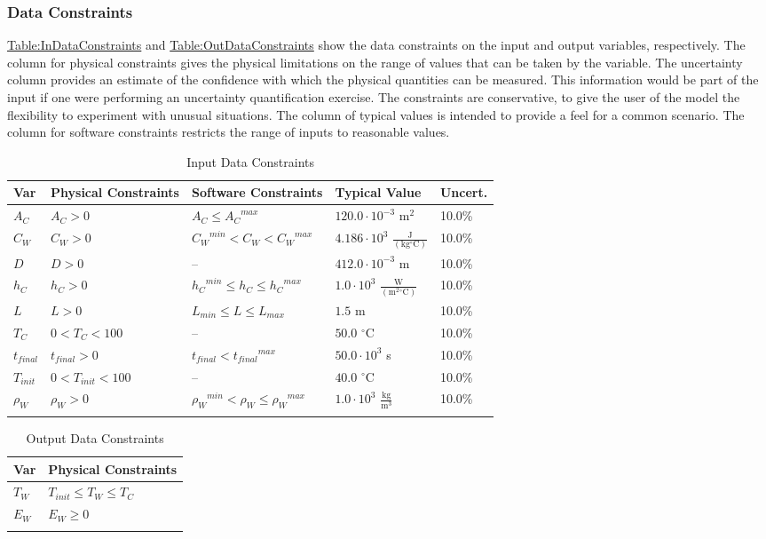 \documentclass[12pt]{article}
\begin{document}
\subsubsection{Data Constraints}
\label{Sec:DataConstraints}
\hyperref[Table:InDataConstraints]{Table:InDataConstraints} and \hyperref[Table:OutDataConstraints]{Table:OutDataConstraints} show the data constraints on the input and output variables, respectively. The column for physical constraints gives the physical limitations on the range of values that can be taken by the variable. The uncertainty column provides an estimate of the confidence with which the physical quantities can be measured. This information would be part of the input if one were performing an uncertainty quantification exercise. The constraints are conservative, to give the user of the model the flexibility to experiment with unusual situations. The column of typical values is intended to provide a feel for a common scenario. The column for software constraints restricts the range of inputs to reasonable values.
\begin{longtable}{l l l l l}
\toprule
Var & Physical Constraints & Software Constraints & Typical Value & Uncert.
\\
\midrule
${A_{C}}$ & ${A_{C}}>0$ & ${A_{C}}\leq{}{{A_{C}}^{max}}$ & $120.0\cdot{}10^{-3}$ $\text{m}^{2}$ & 10.0\%
\\
${C_{W}}$ & ${C_{W}}>0$ & ${{C_{W}}^{min}}<{C_{W}}<{{C_{W}}^{max}}$ & $4.186\cdot{}10^{3}$ $\frac{\text{J}}{(\text{kg}{}^{\circ}\text{C})}$ & 10.0\%
\\
$D$ & $D>0$ & -- & $412.0\cdot{}10^{-3}$ m & 10.0\%
\\
${h_{C}}$ & ${h_{C}}>0$ & ${{h_{C}}^{min}}\leq{}{h_{C}}\leq{}{{h_{C}}^{max}}$ & $1.0\cdot{}10^{3}$ $\frac{\text{W}}{(\text{m}^{2}{}^{\circ}\text{C})}$ & 10.0\%
\\
$L$ & $L>0$ & ${L_{min}}\leq{}L\leq{}{L_{max}}$ & $1.5$ m & 10.0\%
\\
${T_{C}}$ & $0<{T_{C}}<100$ & -- & $50.0$ ${}^{\circ}$C & 10.0\%
\\
${t_{final}}$ & ${t_{final}}>0$ & ${t_{final}}<{{t_{final}}^{max}}$ & $50.0\cdot{}10^{3}$ s & 10.0\%
\\
${T_{init}}$ & $0<{T_{init}}<100$ & -- & $40.0$ ${}^{\circ}$C & 10.0\%
\\
${ρ_{W}}$ & ${ρ_{W}}>0$ & ${{ρ_{W}}^{min}}<{ρ_{W}}\leq{}{{ρ_{W}}^{max}}$ & $1.0\cdot{}10^{3}$ $\frac{\text{kg}}{\text{m}^{3}}$ & 10.0\%
\\
\bottomrule
\caption{Input Data Constraints}
\label{Table:InDataConstraints}
\end{longtable}
\begin{longtable}{l l}
\toprule
Var & Physical Constraints
\\
\midrule
${T_{W}}$ & ${T_{init}}\leq{}{T_{W}}\leq{}{T_{C}}$
\\
${E_{W}}$ & ${E_{W}}\geq{}0$
\\
\bottomrule
\caption{Output Data Constraints}
\label{Table:OutDataConstraints}
\end{longtable}
\end{document}

